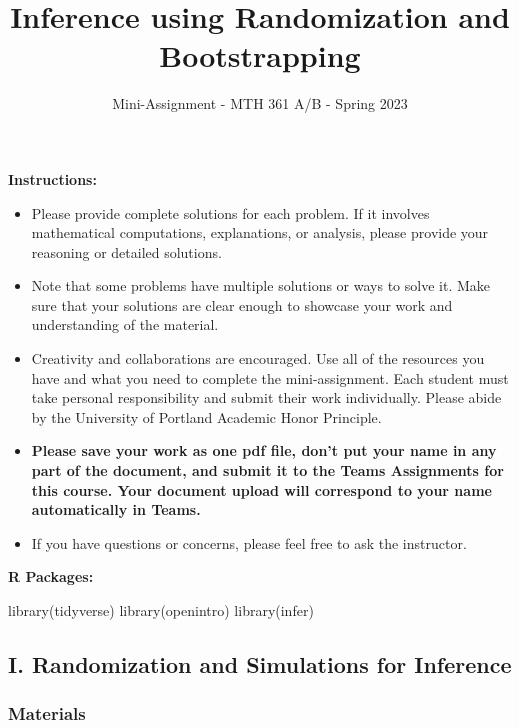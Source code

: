\documentclass[
]{article}
\title{\textbf{Inference using Randomization and Bootstrapping}}
\subtitle{Mini-Assignment - MTH 361 A/B - Spring 2023}
\author{}
\date{\vspace{-2.5em}}
\newenvironment{Shaded}{\begin{snugshade}}{\end{snugshade}}
\newcommand{\FunctionTok}[1]{\textcolor[rgb]{0.00,0.00,0.00}{#1}}
\newcommand{\NormalTok}[1]{#1}
\begin{document}
\maketitle

\hfill\break

\textbf{Instructions:}

\begin{itemize}
\item
  Please provide complete solutions for each problem. If it involves mathematical computations, explanations, or analysis, please provide your reasoning or detailed solutions.
\item
  Note that some problems have multiple solutions or ways to solve it. Make sure that your solutions are clear enough to showcase your work and understanding of the material.
\item
  Creativity and collaborations are encouraged. Use all of the resources you have and what you need to complete the mini-assignment. Each student must take personal responsibility and submit their work individually. Please abide by the University of Portland Academic Honor Principle.
\item
  \textbf{Please save your work as one pdf file, don't put your name in any part of the document, and submit it to the Teams Assignments for this course. Your document upload will correspond to your name automatically in Teams.}
\item
  If you have questions or concerns, please feel free to ask the instructor.
\end{itemize}

\textbf{R Packages:}

\begin{Shaded}
\begin{Highlighting}[]
\FunctionTok{library}\NormalTok{(tidyverse)}
\FunctionTok{library}\NormalTok{(openintro)}
\FunctionTok{library}\NormalTok{(infer)}
\end{Highlighting}
\end{Shaded}

\newpage

\hypertarget{i.-randomization-and-simulations-for-inference}{%
\subsection{I. Randomization and Simulations for Inference}\label{i.-randomization-and-simulations-for-inference}}

\hypertarget{materials}{%
\subsubsection{Materials}\label{materials}}
\end{document}
